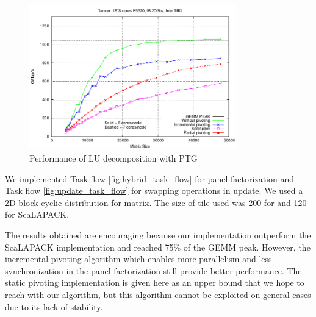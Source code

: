 \begin{figure}
\centering
\includegraphics[width=0.8\textwidth]{figures/gepp.pdf}
\caption{Performance of LU decomposition with PTG\label{fig:pp}} 
\end{figure}

 
We implemented Task flow \ref{fig:hybrid_task_flow} for panel factorization and Task flow \ref{fig:update_task_flow} for swapping operations in update. 
We used a 2D block cyclic distribution for matrix. The size of tile used was 200 for \dague and 120 for ScaLAPACK.

The results obtained are encouraging  because our implementation outperform the ScaLAPACK implementation and reached 75\% of the GEMM peak.
However, the incremental pivoting algorithm which enables more parallelism and less synchronization in the panel factorization still provide better performance.
The static pivoting implementation is given here as an upper bound that we hope to reach with our algorithm, but this algorithm cannot be exploited on general cases due to its lack of stability. 



